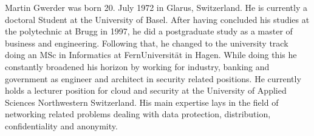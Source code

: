 
Martin Gwerder was born 20. July 1972 in Glarus, Switzerland. He is currently a doctoral Student at the University of Basel. After having concluded his studies at the polytechnic at Brugg in 1997, he did a postgraduate study as a master of business and engineering. Following that, he changed to the university track doing an MSc in Informatics at FernUniversit\"at in Hagen. While doing this he constantly broadened his horizon by working for industry, banking and government as  engineer and architect in security related positions. He currently holds a lecturer position for cloud and security at the University of Applied Sciences Northwestern Switzerland. His main expertise lays in the field of networking related problems dealing with data protection, distribution, confidentiality and anonymity.